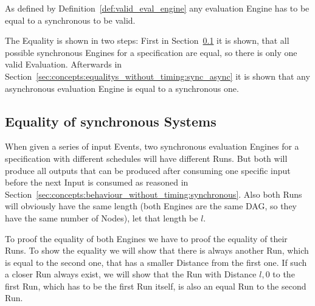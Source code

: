

As defined by Definition~\ref{def:valid_eval_engine} any evaluation Engine has to be equal to a synchronous to be valid.

The Equality is shown in two steps: First in Section~\ref{sec:concepts:equalitys_without_timing:synchronous} it is shown, that all possible synchronous Engines for a specification are equal, so there is only one valid Evaluation.
Afterwards in Section~\ref{sec:concepts:equalitys_without_timing:sync_async} it is shown that any asynchronous evaluation Engine is equal to a synchronous one.


\subsection{Equality of synchronous Systems}
\label{sec:concepts:equalitys_without_timing:synchronous}

When given a series of input Events, two synchronous evaluation Engines for a specification with different schedules will have different Runs.
But both will produce all outputs that can be produced after consuming one specific input before the next Input is consumed as reasoned in Section~\ref{sec:concepts:behaviour_without_timing:synchronous}.
Also both Runs will obviously have the same length (both Engines are the same DAG, so they have the same number of Nodes), let that length be \(l\).

To proof the equality of both Engines we have to proof the equality of their Runs.
To show the equality we will show that there is always another Run, which is equal to the second one, that has a smaller Distance from the first one.
If such a closer Run always exist, we will show that the Run with Distance \(l, 0\) to the first Run, which has to be the first Run itself, is also an equal Run to the second Run.

